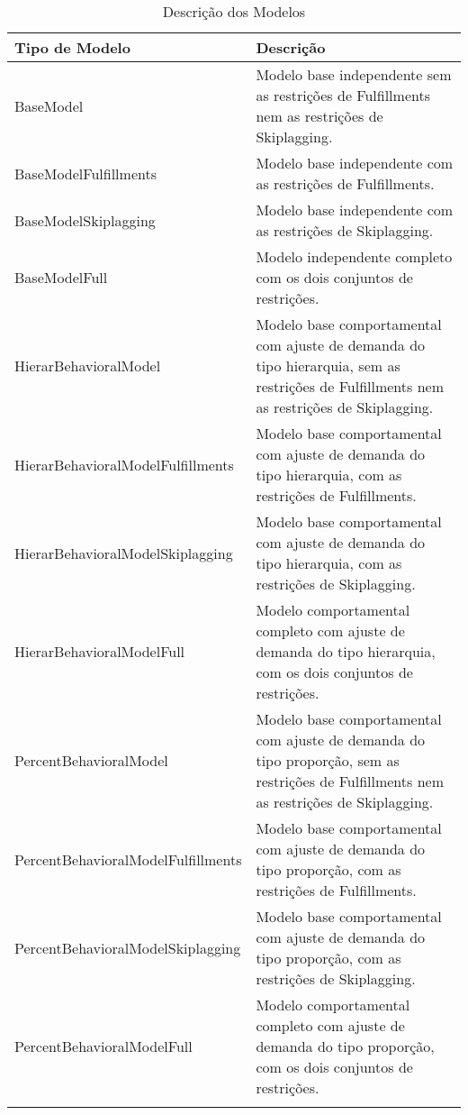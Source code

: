 \begin{small}
	\begin{longtable}{p{5.4cm} p{10.4cm}}
		\hline
		\textbf{Tipo de Modelo}            & \textbf{Descrição}                                                                                                                       \\ \hline
		BaseModel                          & Modelo base independente sem as restrições de Fulfillments nem as restrições de Skiplagging.                                             \\ \hline
		BaseModelFulfillments              & Modelo base independente com as restrições de Fulfillments.                                                                              \\ \hline
		BaseModelSkiplagging               & Modelo base independente com as restrições de Skiplagging.                                                                               \\ \hline
		BaseModelFull                      & Modelo independente completo com os dois conjuntos de restrições.                                                                        \\ \hline
		HierarBehavioralModel              & Modelo base comportamental com ajuste de demanda do tipo hierarquia, sem as restrições de Fulfillments nem as restrições de Skiplagging. \\ \hline
		HierarBehavioralModelFulfillments  & Modelo base comportamental com ajuste de demanda do tipo hierarquia, com as restrições de Fulfillments.                                  \\ \hline
		HierarBehavioralModelSkiplagging   & Modelo base comportamental com ajuste de demanda do tipo hierarquia, com as restrições de Skiplagging.                                   \\ \hline
		HierarBehavioralModelFull          & Modelo comportamental completo com ajuste de demanda do tipo hierarquia, com os dois conjuntos de restrições.                            \\ \hline
		PercentBehavioralModel             & Modelo base comportamental com ajuste de demanda do tipo proporção, sem as restrições de Fulfillments nem as restrições de Skiplagging.  \\ \hline
		PercentBehavioralModelFulfillments & Modelo base comportamental com ajuste de demanda do tipo proporção, com as restrições de Fulfillments.                                   \\ \hline
		PercentBehavioralModelSkiplagging  & Modelo base comportamental com ajuste de demanda do tipo proporção, com as restrições de Skiplagging.                                    \\ \hline
		PercentBehavioralModelFull         & Modelo comportamental completo com ajuste de demanda do tipo proporção, com os dois conjuntos de restrições.                             \\ \hline
		\caption{Descrição dos Modelos}
		\label{tab:modelos}
	\end{longtable}
\end{small}


